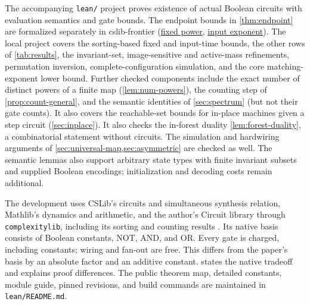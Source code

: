 \documentclass[11pt]{article}
\theoremstyle{definition}
\theoremstyle{remark}
\numberwithin{equation}{section}
\begin{document}
The accompanying \texttt{lean/} project proves existence of actual Boolean
circuits with evaluation semantics and gate bounds. The endpoint bounds
in \cref{thm:endpoint} are formalized separately in cslib-frontier
(\href{https://github.com/cslib-community/cslib-frontier/pull/7522}{fixed power},
\href{https://github.com/cslib-community/cslib-frontier/pull/7527}{input exponent}).
The local project covers the sorting-based fixed and input-time bounds,
the other rows of \cref{tab:results}, the invariant-set, image-sensitive and active-mass
refinements, permutation inversion, complete-configuration simulation,
and the core matching-exponent lower bound.  Further checked components
include the exact number of distinct powers of a finite map
(\cref{lem:num-powers}), the counting step of \cref{prop:count-general},
and the semantic identities of
\cref{sec:spectrum} (but not their gate counts).  It also covers the reachable-set bounds for in-place machines given a step
circuit (\cref{sec:inplace}).  It also checks the in-forest duality
\cref{lem:forest-duality}, a combinatorial statement without circuits.
The simulation and hardwiring arguments of
\cref{sec:universal-map,sec:asymmetric} are checked as well.
The semantic lemmas also support arbitrary
state types with finite invariant subsets and supplied Boolean encodings;
initialization and decoding costs remain additional.

The development uses CSLib's circuits and simultaneous synthesis relation,
Mathlib's dynamics and arithmetic, and the author's Circuit library through
\texttt{complexitylib}, including its sorting and counting results
\cite{CSLib,Mathlib,Complexitylib}.  Its native basis consists of Boolean
constants, NOT, AND, and OR.  Every gate is charged, including constants;
wiring and fan-out are free.  This differs from the paper's basis by an
absolute factor and an additive constant.
 states the native tradeoff and explains proof
differences.  The public theorem map, detailed constants, module guide,
pinned revisions, and build commands are maintained in \texttt{lean/README.md}.
\end{document}
